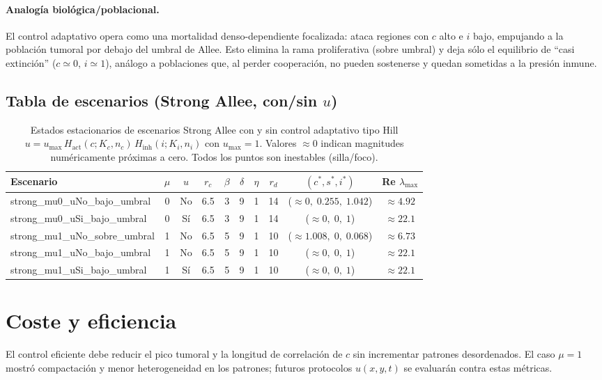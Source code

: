 \paragraph{Analogía biológica/poblacional.} El control adaptativo opera como una mortalidad denso-dependiente focalizada: ataca regiones con $c$ alto e $i$ bajo, empujando a la población tumoral por debajo del umbral de Allee. Esto elimina la rama proliferativa (sobre umbral) y deja sólo el equilibrio de “casi extinción” ($c\simeq0$, $i\simeq1$), análogo a poblaciones que, al perder cooperación, no pueden sostenerse y quedan sometidas a la presión inmune.

\subsection*{Tabla de escenarios (Strong Allee, con/sin $u$)}
\begin{table}[H]
\centering
\scriptsize
\begin{tabular}{lccccccccc}
\toprule
Escenario & $\mu$ & $u$ & $r_c$ & $\beta$ & $\delta$ & $\eta$ & $r_d$ & $(c^*,s^*,i^*)$ & Re $\lambda_{\max}$ \\
\midrule
strong\_mu0\_uNo\_bajo\_umbral & 0 & No & 6.5 & 3 & 9 & 1 & 14 & ($\approx0,\;0.255,\;1.042$) & $\approx4.92$ \\
strong\_mu0\_uSi\_bajo\_umbral & 0 & Sí & 6.5 & 3 & 9 & 1 & 14 & ($\approx0,\;0,\;1$) & $\approx22.1$ \\
\midrule
strong\_mu1\_uNo\_sobre\_umbral & 1 & No & 6.5 & 5 & 9 & 1 & 10 & ($\approx1.008,\;0,\;0.068$) & $\approx6.73$ \\
strong\_mu1\_uNo\_bajo\_umbral & 1 & No & 6.5 & 5 & 9 & 1 & 10 & ($\approx0,\;0,\;1$) & $\approx22.1$ \\
strong\_mu1\_uSi\_bajo\_umbral & 1 & Sí & 6.5 & 5 & 9 & 1 & 10 & ($\approx0,\;0,\;1$) & $\approx22.1$ \\
\bottomrule
\end{tabular}
\caption{Estados estacionarios de escenarios Strong Allee con y sin control adaptativo tipo Hill $u=u_{\max}\,H_{\mathrm{act}}(c;K_c,n_c)\,H_{\mathrm{inh}}(i;K_i,n_i)$ con $u_{\max}=1$. Valores $\approx0$ indican magnitudes numéricamente próximas a cero. Todos los puntos son inestables (silla/foco).}
\label{tab:control_strong}
\end{table}

\section{Coste y eficiencia}
El control eficiente debe reducir el pico tumoral y la longitud de correlación de $c$ sin incrementar patrones desordenados. El caso $\mu=1$ mostró compactación y menor heterogeneidad en los patrones; futuros protocolos $u(x,y,t)$ se evaluarán contra estas métricas.

